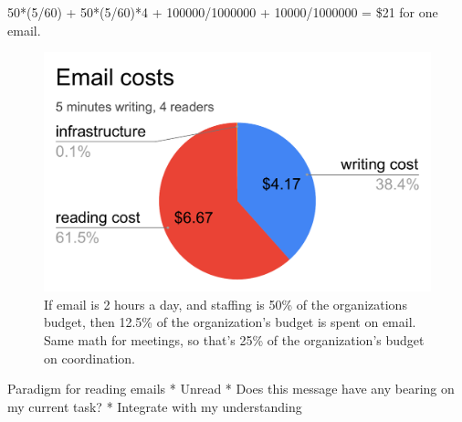 50*(5/60) + 50*(5/60)*4 + 100000/1000000 + 10000/1000000 = \$21 for one email. 

\begin{figure}
    \centering
    \includegraphics{images/email_costs_5minutes_4people.pdf}
    \caption{If email is 2 hours a day, and staffing is 50\% of the organizations budget, then 
    12.5\% of the organization's budget is spent on email. Same math for meetings, so that's 25\% of the organization's budget on coordination.}
    \label{fig:my_label}
\end{figure}


Paradigm for reading emails
* Unread
* Does this message have any bearing on my current task? 
* Integrate with my understanding 